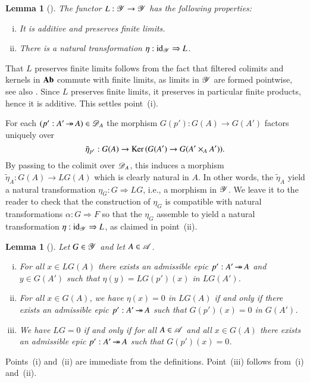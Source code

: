 \documentclass[1p]{elsarticle}
\makeatletter
\renewenvironment{proof}[1][\proofname]{\par
  \pushQED{\qed}%
  \normalfont \topsep6\p@\@plus6\p@\relax
  \trivlist
  \item[\hskip\labelsep
        \scshape
    #1\@addpunct{.}]\ignorespaces
}{%
  \popQED\endtrivlist\@endpefalse
}
\theoremstyle{mythm}
\newtheorem{Lem}[Thm]{Lemma}
\theoremstyle{mydef}
\makeatother
\begin{document}
\begin{Lem}[{\cite[A.7.8]{MR1106918}}]
  \label{lem:L-additive-finite-limits}
  The functor $L: \operatorname{\mathscr{Y}} \to \operatorname{\mathscr{Y}}$ has the following properties:
  \begin{enumerate}[(i)]
    \item
      It is additive and preserves finite limits.

    \item
      There is a natural transformation
      $\eta: \operatorname{id}_{\operatorname{\mathscr{Y}}} \Rightarrow L$.
  \end{enumerate}
\end{Lem}
\begin{proof} 
  That $L$ preserves finite limits follows from the fact that filtered colimits
  and kernels in $\operatorname{\mathbf{Ab}}$ commute with finite limits, as limits
  in $\operatorname{\mathscr{Y}}$ are formed pointwise, see also
  \cite[Lemma~3.3.1]{MR1315049}. Since $L$ preserves finite
  limits, it preserves in particular finite products, hence it is
  additive. This settles point~(i).

  For each $(p':A' \operatorname{\twoheadrightarrow} A) \in \operatorname{\mathscr{D}}_{A}$ the morphism 
  $G(p'): G(A) \to G(A')$ factors uniquely over
  \[
  \tilde{\eta}_{p'}:G(A) \to \operatorname{Ker}{(G(A') \to G(A' \times_{A} A'))}.
  \]
  By passing to the colimit over $\operatorname{\mathscr{D}}_{A}$, this induces a morphism
  $\tilde{\eta}_{A}: G(A) \to LG(A)$
  which is clearly natural in $A$. In other words, the $\tilde{\eta}_{A}$
  yield a natural transformation 
  $\eta_{G}: G \Rightarrow LG$, i.e., a morphism in $\operatorname{\mathscr{Y}}$. We
  leave it to the reader to check that the 
  construction of $\eta_{G}$ is compatible with natural
  transformations $\alpha: G \Rightarrow F$ so that the
  $\eta_{G}$ assemble to yield a
  natural transformation $\eta: \operatorname{id}_{\operatorname{\mathscr{Y}}} \Rightarrow L$,
  as claimed in point~(ii).
\end{proof}


\begin{Lem}[{\cite[A.7.11, (a), (b), (c)]{MR1106918}}]
  \label{lem:technical-lemma-elements}
  Let $G \in \operatorname{\mathscr{Y}}$ and let $A \in \operatorname{\mathscr{A}}$.
  \begin{enumerate}[(i)]
    \item
      For all $x \in LG(A)$ there exists an admissible epic
      $p' : A' \operatorname{\twoheadrightarrow} A$ and $y \in G(A')$ such that
      $\eta(y) = LG(p')(x)$ in $LG(A')$.

    \item
      For all $x \in G(A)$, we have $\eta(x) = 0$ in $LG(A)$ if and
      only if there exists an admissible epic $p': A' \operatorname{\twoheadrightarrow} A$ such
      that $G(p')(x) = 0$ in $G(A')$.

    \item
      We have $LG = 0$ if and only if for all $A \in \operatorname{\mathscr{A}}$ and all
      $x \in G(A)$ there exists an admissible epic $p': A' \operatorname{\twoheadrightarrow} A$
      such that $G(p')(x) = 0$.
 
  \end{enumerate}
\end{Lem}
\begin{proof}
  Points~(i) and~(ii) are immediate from the definitions. Point~(iii)
  follows from~(i) and~(ii).
\end{proof}
\end{document}
